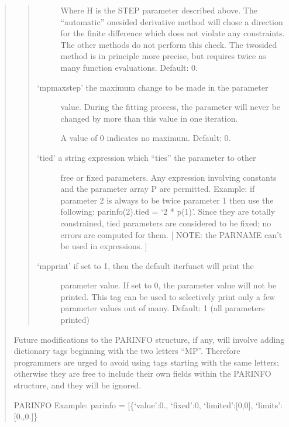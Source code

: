 \documentclass[letterpaper,10pt,english]{sphinxmanual}
\begin{document}
\begin{quote}
\begin{quote}
\begin{description}
\begin{quote}
\begin{quote}
\begin{description}
\end{description}
\end{quote}
\end{quote}

Where H is the STEP parameter described above.  The
“automatic” one\sphinxhyphen{}sided derivative method will chose a
direction for the finite difference which does not
violate any constraints.  The other methods do not
perform this check.  The two\sphinxhyphen{}sided method is in
principle more precise, but requires twice as many
function evaluations.  Default: 0.

\item[{‘mpmaxstep’ \sphinxhyphen{} the maximum change to be made in the parameter}] \leavevmode
value.  During the fitting process, the parameter
will never be changed by more than this value in
one iteration.

A value of 0 indicates no maximum.  Default: 0.

\item[{‘tied’ \sphinxhyphen{} a string expression which “ties” the parameter to other}] \leavevmode
free or fixed parameters.  Any expression involving
constants and the parameter array P are permitted.
Example: if parameter 2 is always to be twice parameter
1 then use the following: parinfo(2).tied = ‘2 * p(1)’.
Since they are totally constrained, tied parameters are
considered to be fixed; no errors are computed for them.
{[} NOTE: the PARNAME can’t be used in expressions. {]}

\item[{‘mpprint’ \sphinxhyphen{} if set to 1, then the default iterfunct will print the}] \leavevmode
parameter value.  If set to 0, the parameter value
will not be printed.  This tag can be used to
selectively print only a few parameter values out of
many.  Default: 1 (all parameters printed)

\end{description}
\end{quote}

Future modifications to the PARINFO structure, if any, will involve
adding dictionary tags beginning with the two letters “MP”.
Therefore programmers are urged to avoid using tags starting with
the same letters; otherwise they are free to include their own
fields within the PARINFO structure, and they will be ignored.

PARINFO Example:
parinfo = {[}\{‘value’:0., ‘fixed’:0, ‘limited’:{[}0,0{]}, ‘limits’:{[}0.,0.{]}\}
\begin{quote}


\end{quote}
\end{quote}
\end{document}
